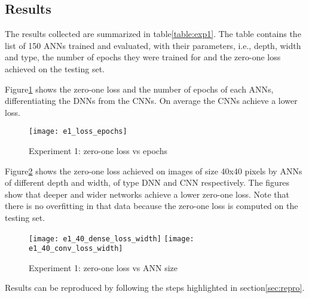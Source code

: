 \subsection{Results}
The results collected are summarized in table\ref{table:exp1}. The table contains the list of 150 ANNs trained and evaluated, with their parameters, i.e., depth, width and type, the number of epochs they were trained for and the zero-one loss achieved on the testing set.


Figure\ref{fig:e1_loss_epochs} shows the zero-one loss and the number of epochs of each ANNs, differentiating the DNNs from the CNNs. On average the CNNs achieve a lower loss.
\begin{figure}
\texttt{[image: e1\_loss\_epochs]}
\caption{Experiment 1: zero-one loss vs epochs}\label{fig:e1_loss_epochs}
\end{figure}

Figure\ref{fig:e1_40_loss_width} shows the zero-one loss achieved on images of size 40x40 pixels by ANNs of different depth and width, of type DNN and CNN respectively. The figures show that deeper and wider networks achieve a lower zero-one loss. Note that there is no overfitting in that data because the zero-one loss is computed on the testing set.
\begin{figure}
\texttt{[image: e1\_40\_dense\_loss\_width]}
\texttt{[image: e1\_40\_conv\_loss\_width]}
\caption{Experiment 1: zero-one loss vs ANN size}\label{fig:e1_40_loss_width}
\end{figure}

Results can be reproduced by following the steps highlighted in section\ref{sec:repro}.
